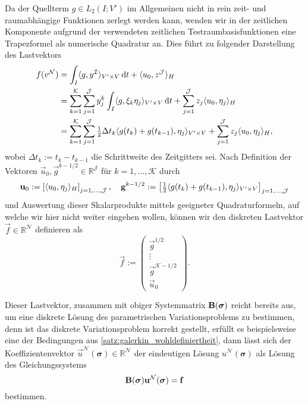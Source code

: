\documentclass[../main.tex]{subfiles}
\begin{document}
Da der Quellterm $g \in L_{2}(I; V')$ im Allgemeinen nicht in rein zeit- und raumabhängige Funktionen zerlegt werden kann, wenden wir in der zeitlichen Komponente aufgrund der verwendeten zeitlichen Testraumbasisfunktionen eine Trapezformel als numerische Quadratur an.
Dies führt zu folgender Darstellung des Lastvektors
\begin{align}
    f(v^{\mathcal N})
    &= \int_{I} \langle g,y^{\mathcal I}\rangle_{V' \times V} \mathop{}\!\mathrm{d} t + \langle u_{0},z^{\mathcal J}\rangle_{H}
    \\&= \sum_{k = 1}^{\mathcal K} \sum_{j = 1}^{\mathcal J} y^{k}_{j} \int_{I} \langle g,\xi_{k} \eta_{j}\rangle_{V' \times V} \mathop{}\!\mathrm{d} t + \sum_{j = 1}^{\mathcal J} z_{j} \langle u_{0},\eta_{j}\rangle_{H}
    \\&= \sum_{k = 1}^{\mathcal K} \sum_{j = 1}^{\mathcal J} \tfrac{1}{2} \Delta t_{k} \langle g(t_{k}) + g(t_{k - 1}),\eta_{j}\rangle_{V' \times V}
         + \sum_{j = 1}^{\mathcal J} z_{j} \langle u_{0},\eta_{j}\rangle_{H},
\end{align}
wobei $\Delta t_{k} := t_{k} - t_{k - 1}$ die Schrittweite des Zeitgitters sei.
Nach Definition der Vektoren $\vec{u}_{0}, \vec{g}^{k - 1/2} \in \mathbb{R}^{\mathcal J}$ für $k = 1, \dots, \mathcal K$ durch
\begin{equation}
    \mathbf{u}_{0} := \left[ \langle u_{0},\eta_{j}\rangle_{H} \right]_{j = 1, \dots, \mathcal J },
    \quad
    \mathbf{g}^{k - 1/2} := \left[ \tfrac{1}{2} \langle g(t_{k}) + g(t_{k - 1}),\eta_{j}\rangle_{V' \times V}  \right]_{j = 1, \dots, \mathcal J}
\end{equation}
und Auswertung dieser Skalarprodukte mittels geeigneter Quadraturformeln, auf welche wir hier nicht weiter eingehen wollen, können wir den diskreten Lastvektor $\vec{f} \in \mathbb{R}^{\mathcal N}$ definieren als
\begin{equation}
    \vec{f} := \begin{pmatrix}
        \vec{g}^{1/2} \\
        \vdots\\
        \vec{g}^{\mathcal K - 1/2}\\
        \vec{u}_{0}
    \end{pmatrix}.
\end{equation}

Dieser Lastvektor, zusammen mit obiger Systemmatrix $\mathbf{B}(\bm \sigma)$ reicht bereits aus, um eine diskrete Lösung des parametrischen Variationsproblems zu bestimmen, denn ist das diskrete Variationsproblem korrekt gestellt, erfüllt es beispielsweise eine der Bedingungen aus \cref{satz:galerkin_wohldefiniertheit}, dann lässt sich der Koeffizientenvektor $\vec{u}^{\mathcal N}(\bm \sigma) \in \mathbb{R}^{\mathcal N}$ der eindeutigen Lösung $u^{\mathcal N}(\bm \sigma)$ als Lösung des Gleichungssystems
\begin{equation}
    \mathbf{B}(\bm \sigma) \mathbf{u}^{\mathcal N}(\bm \sigma) = \mathbf{f}
\end{equation}
bestimmen.
\end{document}
